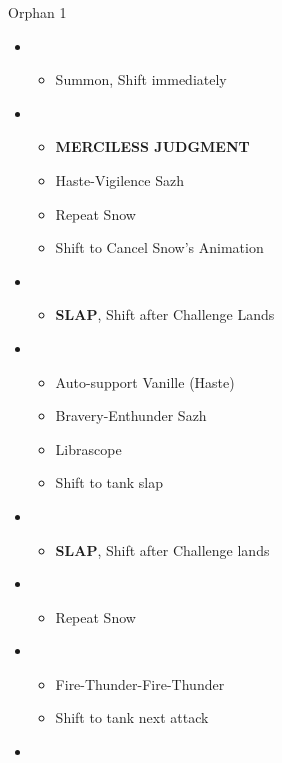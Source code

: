\begin{battle}[2:55]{Orphan 1}
		\begin{itemize}
			\item \second
			      \begin{itemize}
				      \item Summon, Shift immediately
			      \end{itemize}
			\item \fourth
			      \begin{itemize}
				      \item \textbf{MERCILESS JUDGMENT}
				      \item Haste-Vigilence Sazh
				      \item Repeat Snow
				      \item Shift to Cancel Snow's Animation
			      \end{itemize}
			\item \third
			      \begin{itemize}
				      \item \textbf{SLAP}, Shift after Challenge Lands
			      \end{itemize}
			\item \fourth
			      \begin{itemize}
				      \item Auto-support Vanille (Haste)
				      \item Bravery-Enthunder Sazh
				      \item Librascope
				      \item Shift to tank slap
			      \end{itemize}
			\item \third
			      \begin{itemize}
				      \item \textbf{SLAP}, Shift after Challenge lands
			      \end{itemize}
			\item \fourth
			      \begin{itemize}
				      \item Repeat Snow
			      \end{itemize}
			\item \fifth
			      \begin{itemize}
				      \item Fire-Thunder-Fire-Thunder
				      \item Shift to tank next attack
			      \end{itemize}
			\item \third

\end{itemize}
\end{battle}
